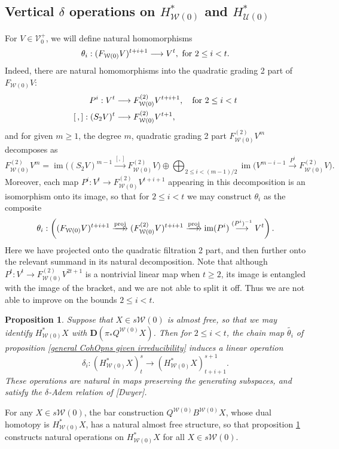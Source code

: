 \documentclass[11pt]{amsart}
\theoremstyle{plain}
\newtheorem{prop}[thm]{Proposition}
\theoremstyle{definition}
\DeclareMathOperator{\im}{im}
\renewcommand{\to}{\longrightarrow}
\newcommand{\calW}{\mathcal{W}}
\newcommand{\calU}{\mathcal{U}}
\newcommand{\calV}{\mathcal{V}}
\newcommand{\calw}{\mathcal{W}}
\theoremstyle{plain}
\newcommand{\vect}[2]{\calV^{#1}_{#2}}
\newcommand{\dual}{\mathbf{D}}
\begin{document}
\begin{Cohomology Operations for W and U}
\subsection{Vertical $\delta$ operations on $H^*_{\calW(0)}$ and $H^*_{\calU(0)}$}
For $V\in \vect{+}{0}$, we will define natural homomorphisms
\[\theta_i:(F_{\calW(0)}V)^{t+i+1}\to V^{t}, \textup{ for $2\leq i<t$}.\]
Indeed, there are natural homomorphisms into the quadratic grading 2 part of $F_{\calW(0)}V$:
\begin{align*}
P^i:V^{t}&\to F_{\calW(0)}^{(2)}V^{t+i+1}, \textup{\quad  for $2\leq i<t$}\\
[\,,]:(S_2V)^{t}&\to F_{\calW(0)}^{(2)}V^{t+1},
\end{align*}
and for given $m\geq1$, the degree $m$, quadratic grading 2 part $F_{\calW(0)}^{(2)}V^m$ decomposes as
%
\[F_{\calW(0)}^{(2)}V^{m}=%
\im \bigl((S_2V)^{m-1}\overset{[,]}{\to} F_{\calW(0)}^{(2)}V\bigr)%
\oplus\bigoplus_{\!\!\!\!\!\!2\leq i< (m-1)/2\!\!\!\!\!\!}\im \bigl(V^{m-i-1}\overset{P^i}{\to}F_{\calW(0)}^{(2)}V\bigr).\]
Moreover, each map $P^i:V^t\to F_{\calW(0)}^{(2)}V^{t+i+1}$ appearing in this decomposition is an isomorphism onto its image, so that for $2\leq i <t$ we may construct $\theta_i$ as the composite
\[\theta_i:\left((F_{\calW(0)}V)^{t+i+1}\overset{\textup{proj}}{\makebox[.06ex][l]{$\to$}\to} (F_{\calW(0)}^{(2)}V)^{t+i+1}\overset{\textup{proj}}{\makebox[.06ex][l]{$\to$}\to} \im (P^i)\overset{(P^i)^{-1}}{\to}V^{t}\right).\]
Here we have projected onto the quadratic filtration 2 part, and then further onto the relevant summand in its natural decomposition. Note that although $P^t:V^t\to F_{\calW(0)}^{(2)}V^{2t+1}$ is a nontrivial linear map when $t\geq2$, its image is entangled with the image of the bracket, and we are not able to split it off. Thus we are not able to improve on the bounds $2\leq i< t$.
\begin{prop}\label{operations on goerss homology}
Suppose that $X\in s\calW(0)$ is almost free, so that we may identify $H^*_{\calW(0)}X$ with $\dual(\pi_*Q^{\calw(0)}X)$. Then for $2\leq i <t$, the chain map $\widetilde{\theta_i}$ of proposition \ref{general CohOpns given irreducibility} induces a linear operation
\[\delta_i:(H^*_{\calW(0)}X)^{s}_t\to (H^*_{\calW(0)}X)^{s+1}_{t+i+1}.\] 
These operations are natural in maps preserving the generating subspaces, and satisfy the $\delta$-Adem relation of [Dwyer].
\end{prop}
\noindent For any $X\in s\calW(0)$, the bar construction $Q^{\calW(0)}B^{\calW(0)}X$, whose dual homotopy is $H^*_{\calW(0)}X$, has a natural almost free structure, so that proposition \ref{operations on goerss homology} constructs natural  operations on $H^*_{\calw(0)}X$ for all $X\in s\calw(0)$.


\end{Cohomology Operations for W and U}
\end{document}
